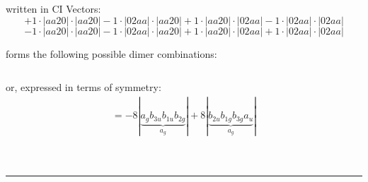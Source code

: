 \documentclass{article}
\begin{document}
\begin{minipage}{\linewidth}
written in CI Vectors: 
 $$+ 1 \cdot \left|aa20 \right| \cdot \left| aa20 \right| 
- 1 \cdot \left|02aa \right| \cdot \left| aa20 \right| 
+ 1 \cdot \left|aa20 \right| \cdot \left| 02aa \right| 
- 1 \cdot \left|02aa \right| \cdot \left| 02aa \right| 
 $$ $$ - 1 \cdot \left|aa20 \right| \cdot \left| aa20 \right| 
- 1 \cdot \left|02aa \right| \cdot \left| aa20 \right| 
+ 1 \cdot \left|aa20 \right| \cdot \left| 02aa \right| 
+ 1 \cdot \left|02aa \right| \cdot \left| 02aa \right| 
$$



 forms the following possible dimer combinations:

$$$$



\end{minipage}
\vspace{0.5cm}


or, expressed in terms of symmetry:\begin{multline*}
=-8\left|\underbrace{a_{g} b_{3u} b_{1u} b_{2g}}_{a_{g}}\right|+8\left|\underbrace{b_{2u} b_{1g} b_{3g} a_{u}}_{a_{g}}\right|
\end{multline*}\\\\

 


\hrule
\vspace{0.5cm}
\end{document}
